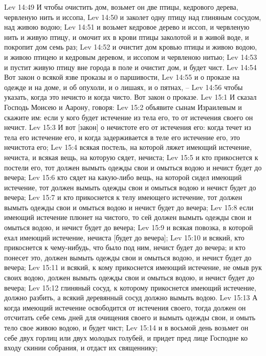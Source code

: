 Lev 14:49  И чтобы очистить дом, возьмет он две птицы, кедрового дерева, червленую нить и иссопа,
Lev 14:50  и заколет одну птицу над глиняным сосудом, над живою водою;
Lev 14:51  и возьмет кедровое дерево и иссоп, и червленую нить и живую птицу, и омочит их в крови птицы заколотой и в живой воде, и покропит дом семь раз;
Lev 14:52  и очистит дом кровью птицы и живою водою, и живою птицею и кедровым деревом, и иссопом и червленою нитью;
Lev 14:53  и пустит живую птицу вне города в поле и очистит дом, и будет чист.
Lev 14:54  Вот закон о всякой язве проказы и о паршивости,
Lev 14:55  и о проказе на одежде и на доме, и об опухоли, и о лишаях, и о пятнах, --
Lev 14:56  чтобы указать, когда это нечисто и когда чисто. Вот закон о проказе.
Lev 15:1  И сказал Господь Моисею и Аарону, говоря:
Lev 15:2  объявите сынам Израилевым и скажите им: если у кого будет истечение из тела его, то от истечения своего он нечист.
Lev 15:3  И вот [закон] о нечистоте его от истечения его: когда течет из тела его истечение его, и когда задерживается в теле его истечение его, это нечистота его;
Lev 15:4  всякая постель, на которой ляжет имеющий истечение, нечиста, и всякая вещь, на которую сядет, нечиста;
Lev 15:5  и кто прикоснется к постели его, тот должен вымыть одежды свои и омыться водою и нечист будет до вечера;
Lev 15:6  кто сядет на какую-либо вещь, на которой сидел имеющий истечение, тот должен вымыть одежды свои и омыться водою и нечист будет до вечера;
Lev 15:7  и кто прикоснется к телу имеющего истечение, тот должен вымыть одежды свои и омыться водою и нечист будет до вечера;
Lev 15:8  если имеющий истечение плюнет на чистого, то сей должен вымыть одежды свои и омыться водою, и нечист будет до вечера;
Lev 15:9  и всякая повозка, в которой ехал имеющий истечение, нечиста [будет до вечера];
Lev 15:10  и всякий, кто прикоснется к чему-нибудь, что было под ним, нечист будет до вечера; и кто понесет это, должен вымыть одежды свои и омыться водою, и нечист будет до вечера;
Lev 15:11  и всякий, к кому прикоснется имеющий истечение, не омыв рук своих водою, должен вымыть одежды свои и омыться водою, и нечист будет до вечера;
Lev 15:12  глиняный сосуд, к которому прикоснется имеющий истечение, должно разбить, а всякий деревянный сосуд должно вымыть водою.
Lev 15:13  А когда имеющий истечение освободится от истечения своего, тогда должен он отсчитать себе семь дней для очищения своего и вымыть одежды свои, и омыть тело свое живою водою, и будет чист;
Lev 15:14  и в восьмой день возьмет он себе двух горлиц или двух молодых голубей, и придет пред лице Господне ко входу скинии собрания, и отдаст их священнику;
